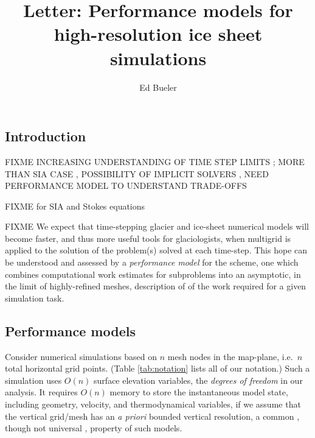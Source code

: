 \documentclass[twocolumn,letterpaper]{igs}
\begin{document}
\title[Performance models for high-resolution ice sheet simulations]{Letter: Performance models for \\ high-resolution ice sheet simulations}


\author{Ed Bueler}



\maketitle

\sectionsize

\subsection{Introduction}

FIXME INCREASING UNDERSTANDING OF TIME STEP LIMITS \citep{Chengetal2017,Robinsonetal2022}; MORE THAN SIA CASE \citep[for comparison]{HindmarshPayne1996}, POSSIBILITY OF IMPLICIT SOLVERS \citep{Bueler2016,WirbelJarosch2020}, NEED PERFORMANCE MODEL TO UNDERSTAND TRADE-OFFS

FIXME \citep{GreveBlatter2009,SchoofHewitt2013} for SIA and Stokes equations

FIXME We expect that time-stepping glacier and ice-sheet numerical models will become faster, and thus more useful tools for glaciologists, when multigrid is applied to the solution of the problem(s) solved at each time-step.  This hope can be understood and assessed by a \emph{performance model} for the scheme, one which combines computational work estimates for subproblems into an asymptotic, in the limit of highly-refined meshes, description of of the work required for a given simulation task.

\subsection{Performance models}

Consider numerical simulations based on $n$ mesh nodes in the map-plane, i.e.~$n$ total horizontal grid points.  (Table \ref{tab:notation} lists all of our notation.)  Such a simulation uses $O(n)$ surface elevation variables, the \emph{degrees of freedom} in our analysis.  It requires $O(n)$ memory to store the instantaneous model state, including geometry, velocity, and thermodynamical variables, if we assume that the vertical grid/mesh has an \emph{a priori} bounded vertical resolution, a common \citep[for example]{Brinkerhoffetal2017,Hoffmanetal2018}, though not universal \citep{IsaacStadlerGhattas2015}, property of such models.
\end{document}
